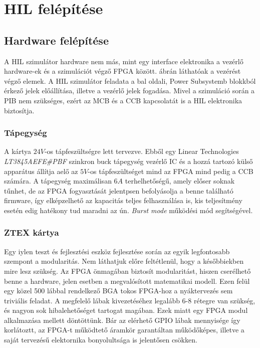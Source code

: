 \chapter{HIL felépítése}

\section{Hardware felépítése}

A HIL szimulátor hardware nem más, mint egy interface elektronika a vezérlő hardware-ek és a szimulációt végző FPGA között.  ábrán láthatóak a vezérést végző elemek. A HIL szimulátor feladata a bal oldali, Power Subsystemb blokkból érkező jelek előállítása, illetve a vezérlő jelek fogadása. Mivel a szimuláció során a PIB nem szükséges, ezért az MCB és a CCB kapcsolatát is a HIL elektronika biztosítja.


\subsection{Tápegység}
A kártya $24 V$-os tápfeszültségre lett tervezve. Ebből egy Linear Technologies \emph{LT3845AEFE#PBF} szinkron buck tápegység vezérlő IC és a hozzá tartozó külső apparátus állítja aelő az $5 V$-os tápfeszültséget mind az FPGA mind pedig a CCB számára. A tápegység maximálisan $6 A$ terhelhetőségű, amely előser soknak tűnhet, de az FPGA fogyasztását jelentpsen befolyásolja a benne található firmware, így elképzelhető az kapacitás teljes felhasználása is, kis teljesítmény esetén edig hatékony tud maradni az ún. \emph{Burst mode} működési mód segítségével.

\subsection{ZTEX kártya}

Egy iylen teszt és fejlesztési eszköz fejlesztése során az egyik legfontosabb szempont a modularitás. Nem láthatjuk előre feltétlenül, hogy a későbbiekben mire lesz szükség. Az FPGA önmagában biztosít modularitást, hiszen cserélhető benne a hardware, jelen esetben a megvalósított matematikai modell. Ezen felül egy közel 500 lábbal rendelkező BGA tokos FPGA-hoz a nyáktervezés sem triviális feladat. A megfelelő lábak kivezetéséhez legalább 6-8 rétegre van szükség, és nagyon sok hibalehetőséget tartogat magában. Ezek miatt egy FPGA modul alkalmazása mellett döntöttünk. Bár az elérhető GPIO lábak mennyisége így korlátoztt, az FPGA-t működtető áramkör garantáltan működőképes, illetve a saját tervezésű elektornika bonyolultsága is jelentősen csökken.


